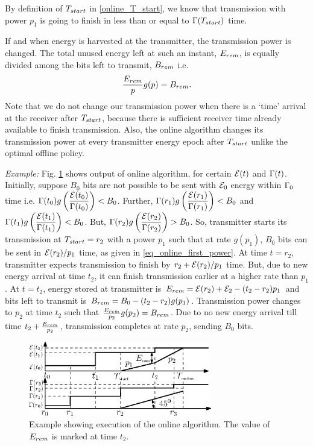 By definition of $T_{\mbox{\scriptsize{start}}}$ in \eqref{online_T_start}, we know that transmission with power $p_1$ is going to finish in less than or equal to  $\TRx(T_{\mbox{\scriptsize{start}}})$ time.

If and when energy is harvested at the transmitter, the transmission power is changed. The total unused energy left at such an instant, $E_{\mbox{\scriptsize{rem}}}$, is equally divided among the bits left to transmit, $B_{\mbox{\scriptsize{rem}}}$ i.e. 
\begin{equation}
\frac{E_{\mbox{\scriptsize{rem}}}}{p} g(p)= B_{\mbox{\scriptsize{rem}}}.\end{equation}
Note that we do not change our transmission power when there is a `time' arrival at the receiver after $T_{\mbox{\scriptsize{start}}}$, because there is sufficient receiver time already available to finish transmission. Also, the online algorithm changes its transmission power at every transmitter energy epoch after $T_{\mbox{\scriptsize{start}}}$ unlike the optimal offline policy. 

\textit{Example:} Fig. \ref{figure_online_example} shows output of online algorithm, for certain $\mathcal{E}(t)$ and $\Gamma(t)$. Initially, suppose $B_0$ bits are not possible to be sent with $\mathcal{E}_0$ energy  within $\Gamma_0$ time i.e. $\Gamma(t_0)g\left( \dfrac{\mathcal{E}(t_0)}{\Gamma(t_0)}\right)<B_0$. Further, $\Gamma(r_1)g\left( \dfrac{\mathcal{E}(r_1)}{\Gamma(r_1)}\right)<B_0$ and $\Gamma(t_1)g\left( \dfrac{\mathcal{E}(t_1)}{\Gamma(t_1)}\right)<B_0$. But, $\Gamma(r_2)g\left( \dfrac{\mathcal{E}(r_2)}{\Gamma(r_2)}\right)>B_0$. So, transmitter starts its transmission at $T_{\mbox{\scriptsize{start}}}=r_2$ with a power $p_1$ such that at rate $g(p_1)$, $B_0$ bits can be sent in $\mathcal{E}(r_2)/p_1$ time, as given in \eqref{eq_online_first_power}. At time $t=r_2$, transmitter expects transmission to finish by $r_2+\mathcal{E}(r_2)/p_1$ time. But, due to new energy arrival at time $t_2$, it can finish transmission earlier at a higher rate than $p_1$. At $t=t_2$, energy stored at transmitter is $E_{\mbox{\scriptsize{rem}}}=\ETx(r_2)+\ETx_2-(t_2-r_2)p_1$ and bits left to transmit is $B_{\mbox{\scriptsize{rem}}}=B_0-(t_2-r_2)g(p_1)$. Transmission power changes to $p_2$ at time $t_2$ such that $\frac{E_{\mbox{\scriptsize{rem}}}}{p_2}g(p_2)=B_{\mbox{\scriptsize{rem}}}$. Due to no new energy arrival till time $t_2+\frac{E_{\mbox{\scriptsize{rem}}}}{p_2}$, transmission completes at rate $p_2$, sending $B_0$ bits. 

\begin{figure}
\centering
  \centerline{\includegraphics[width=8cm]{online.eps}}
\caption{Example showing execution of the online algorithm. The value of $E_{\mbox{\scriptsize{rem}}}$ is marked at time $t_2$.}\label{figure_online_example}
\end{figure}


